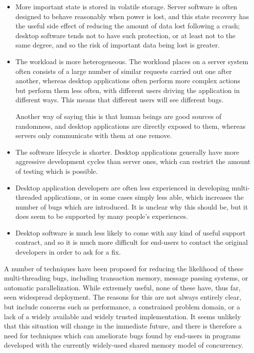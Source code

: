 \documentclass[10pt,a4paper,twocolumn]{article}
\begin{document}
\begin{itemize}
\item More important state is stored in volatile storage.  Server
  software is often designed to behave reasonably when power is lost,
  and this state recovery has the useful side effect of reducing the
  amount of data lost following a crash; desktop software tends not to
  have such protection, or at least not to the same degree, and so
  the risk of important data being lost is greater.

\item The workload is more heterogeneous.  The workload places on a
  server system often consists of a large number of similar requests
  carried out one after another, whereas desktop applications often
  perform more complex actions but perform them less often, with
  different users driving the application in different ways.  This means
  that different users will see different bugs.
  
  Another way of saying this is that human beings are good sources of
  randomness, and desktop applications are directly exposed to them,
  whereas servers only communicate with them at one remove.

\item The software lifecycle is shorter.  Desktop applications
  generally have more aggressive development cycles than server ones,
  which can restrict the amount of testing which is possible.

\item Desktop application developers are often less experienced in
  developing multi-threaded applications, or in some cases simply less
  able, which increases the number of bugs which are introduced.  It
  is unclear why this should be, but it does seem to be supported by
  many people's experiences.

\item Desktop software is much less likely to come with any kind of
  useful support contract, and so it is much more difficult for
  end-users to contact the original developers in order to ask for a
  fix.
\end{itemize}

A number of techniques have been proposed for reducing the likelihood
of these multi-threading bugs, including transaction
memory\cite{Shavit1997}, message passing systems\needCite{}, or
automatic parallelization\cite{Bacon1994}.  While extremely useful,
none of these have, thus far, seen widespread deployment.  The reasons
for this are not always entirely clear, but include concerns such as
performance, a constrained problem domain, or a lack of a widely
available and widely trusted implementation.  It seems unlikely that
this situation will change in the immediate future, and there is
therefore a need for techniques which can ameliorate bugs found by
end-users in programs developed with the currently widely-used shared
memory model of concurrency.
\end{document}
